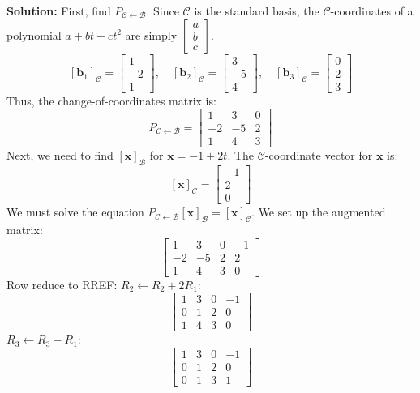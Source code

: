 \documentclass[11pt]{article}
\begin{document}
\textbf{Solution:}
First, find $P_{\mathcal{C} \leftarrow \mathcal{B}}$. Since $\mathcal{C}$ is the standard basis, the $\mathcal{C}$-coordinates of a polynomial $a + bt + ct^2$ are simply $\begin{bmatrix} a \\ b \\ c \end{bmatrix}$.
\[ [\mathbf{b}_1]_{\mathcal{C}} = \begin{bmatrix} 1 \\ -2 \\ 1 \end{bmatrix}, \quad [\mathbf{b}_2]_{\mathcal{C}} = \begin{bmatrix} 3 \\ -5 \\ 4 \end{bmatrix}, \quad [\mathbf{b}_3]_{\mathcal{C}} = \begin{bmatrix} 0 \\ 2 \\ 3 \end{bmatrix} \]
Thus, the change-of-coordinates matrix is:
\[ P_{\mathcal{C} \leftarrow \mathcal{B}} = \begin{bmatrix} 1 & 3 & 0 \\ -2 & -5 & 2 \\ 1 & 4 & 3 \end{bmatrix} \]
Next, we need to find $[\mathbf{x}]_{\mathcal{B}}$ for $\mathbf{x} = -1 + 2t$. The $\mathcal{C}$-coordinate vector for $\mathbf{x}$ is:
\[ [\mathbf{x}]_{\mathcal{C}} = \begin{bmatrix} -1 \\ 2 \\ 0 \end{bmatrix} \]
We must solve the equation $P_{\mathcal{C} \leftarrow \mathcal{B}} [\mathbf{x}]_{\mathcal{B}} = [\mathbf{x}]_{\mathcal{C}}$. We set up the augmented matrix:
\[ \begin{bmatrix} 1 & 3 & 0 & -1 \\ -2 & -5 & 2 & 2 \\ 1 & 4 & 3 & 0 \end{bmatrix} \]
Row reduce to RREF:
$R_2 \leftarrow R_2 + 2R_1$:
\[ \begin{bmatrix} 1 & 3 & 0 & -1 \\ 0 & 1 & 2 & 0 \\ 1 & 4 & 3 & 0 \end{bmatrix} \]
$R_3 \leftarrow R_3 - R_1$:
\[ \begin{bmatrix} 1 & 3 & 0 & -1 \\ 0 & 1 & 2 & 0 \\ 0 & 1 & 3 & 1 \end{bmatrix} \]
\end{document}
